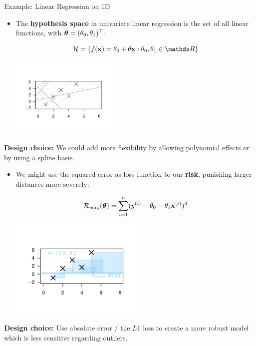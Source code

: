 \documentclass[11pt,compress,t,notes=noshow, xcolor=table]{beamer}
\begin{document}
\begin{vbframe}{Example: Linear Regression on 1D}


\begin{itemize}
  
  \item The \textbf{hypothesis space} in univariate linear regression is the set 
  of all linear functions, with $\bm{\theta} = (\theta_0, \theta_1)^\top$:
  
  $$\Hspace = \{\fx = \theta_0 + \theta \xv: \theta_0, \theta_1 \in \R \}$$
  
  \begin{center}
    \includegraphics[trim = 1.5cm 1.5cm 1.5cm 1.5cm, width = 0.4\textwidth]{figure/lm_reg3} 
  \end{center}
\end{itemize}
  \textbf{Design choice:} We could add more flexibility by allowing polynomial effects or by using a spline basis.
  
  \framebreak
\begin{itemize}  
  \item We might use the squared error as loss function to our
  \textbf{risk}, punishing larger distances %
  more severely:
  
  $$\mathcal{R}_{\text{emp}}(\bm{\theta}) = \sum\limits_{i=1}^n (y^{(i)} - \theta_0 - \theta_1 \mathbf{x}^{(i)})^2$$
  
  \begin{center}
    \includegraphics[trim = 1.5cm 1.5cm 1.5cm 1.5cm, width = 0.5\textwidth]{figure/lm_reg1} 
  \end{center}
\end{itemize}
  \textbf{Design choice:} Use absolute error / the $L1$ loss to create a more robust model which is less sensitive regarding outliers.
  

\end{vbframe}
\end{document}
